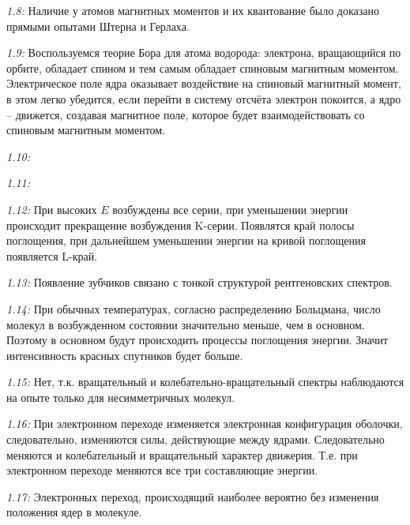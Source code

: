     \emph{1.8: }
        Наличие у атомов магнитных моментов и их квантование было 
        доказано прямыми опытами Штерна и Герлаха.

    \emph{1.9: }
        Воспользуемся теорие Бора для атома водорода: электрона, 
        вращающийся по орбите, обладает спином и тем самым обладает 
        спиновым магнитным моментом. Электрическое поле ядра оказывает 
        воздействие на спиновый магнитный момент, в этом легко 
        убедится, если перейти в систему отсчёта электрон покоится, а 
        ядро -- движется, создавая магнитное поле, которое будет 
        взаимодействовать со спиновым магнитным моментом.

    \emph{1.10: }

    \emph{1.11: }
   
    \emph{1.12: }
        При высоких \( E \) возбуждены все серии, при уменьшении энергии 
        происходит прекращение возбуждения K-серии. Появлятся край 
        полосы поглощения, при дальнейшем уменьшении энергии на кривой 
        поглощения появляется L-край.

    \emph{1.13: }
        Появление зубчиков связано с тонкой структурой рентгеновских 
        спектров.

    \emph{1.14: }
        При обычных температурах, согласно распределению Больцмана, 
        число молекул в возбужденном состоянии значительно меньше, 
        чем в основном. Поэтому в основном будут происходить процессы 
        поглощения энергии. Значит интенсивность красных спутников будет 
        больше.

    \emph{1.15: }
        Нет, т.к. вращательный и колебательно-вращательный спектры 
        наблюдаются на опыте только для несимметричных молекул.

    \emph{1.16: }
        При электронном переходе изменяется электронная конфигурация 
        оболочки, следовательно, изменяются силы, действующие между 
        ядрами. Следовательно меняются и колебательный и вращательный 
        характер движерия. Т.е. при электронном переходе меняются все 
        три составляющие энергии.

    \emph{1.17: }
        Электронных переход, происходящий наиболее вероятно без изменения 
        положения ядер в молекуле.

